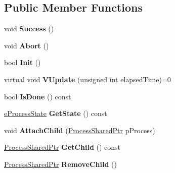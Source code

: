 \subsection*{Public Member Functions}
\begin{DoxyCompactItemize}
\item 
\hypertarget{classProcess_a729e5c7d6b2497b630dba98033043fad}{void {\bfseries Success} ()}\label{classProcess_a729e5c7d6b2497b630dba98033043fad}

\item 
\hypertarget{classProcess_aafcac4d2d3bd07029079fd7bd1a4472c}{void {\bfseries Abort} ()}\label{classProcess_aafcac4d2d3bd07029079fd7bd1a4472c}

\item 
\hypertarget{classProcess_a8bb4de9f1c31ca6330a1413dc2e645ed}{bool {\bfseries Init} ()}\label{classProcess_a8bb4de9f1c31ca6330a1413dc2e645ed}

\item 
\hypertarget{classProcess_aa3bffb61c3a3f881a1405874a870ba63}{virtual void {\bfseries V\-Update} (unsigned int elapsed\-Time)=0}\label{classProcess_aa3bffb61c3a3f881a1405874a870ba63}

\item 
\hypertarget{classProcess_a7987e40f3c8b29b820e13113e88e2a7f}{bool {\bfseries Is\-Done} () const }\label{classProcess_a7987e40f3c8b29b820e13113e88e2a7f}

\item 
\hypertarget{classProcess_a9f6fb77b737aa7acd6e4a974e0cf689c}{\hyperlink{Process_8h_a05a15f01bc448f46ab33296150afb6eb}{e\-Process\-State} {\bfseries Get\-State} () const }\label{classProcess_a9f6fb77b737aa7acd6e4a974e0cf689c}

\item 
\hypertarget{classProcess_ab695f1d82267b8b6832259bb7587c9e5}{void {\bfseries Attach\-Child} (\hyperlink{Process_8h_af04951552f62d8a3c69cca91c23500cc}{Process\-Shared\-Ptr} p\-Process)}\label{classProcess_ab695f1d82267b8b6832259bb7587c9e5}

\item 
\hypertarget{classProcess_ad3b20cadfabddc4ebbbb26e6a863f39a}{\hyperlink{Process_8h_af04951552f62d8a3c69cca91c23500cc}{Process\-Shared\-Ptr} {\bfseries Get\-Child} () const }\label{classProcess_ad3b20cadfabddc4ebbbb26e6a863f39a}

\item 
\hypertarget{classProcess_a2af160117377bdf44bf7180fd9c92c44}{\hyperlink{Process_8h_af04951552f62d8a3c69cca91c23500cc}{Process\-Shared\-Ptr} {\bfseries Remove\-Child} ()}\label{classProcess_a2af160117377bdf44bf7180fd9c92c44}

\end{DoxyCompactItemize}
